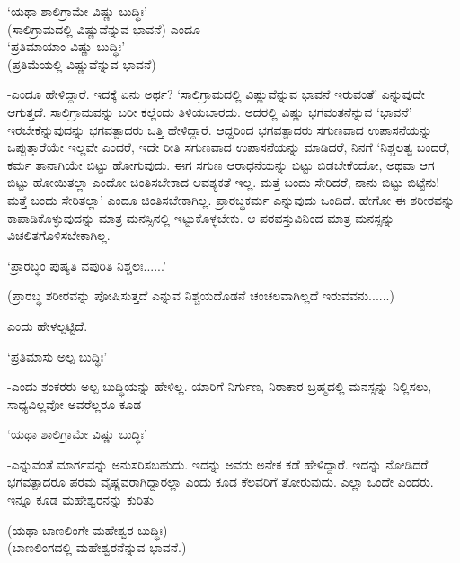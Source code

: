 \begin{shloka}
`ಯಥಾ ಶಾಲಿಗ್ರಾಮೇ ವಿಷ್ಣು ಬುದ್ಧಿಃ'\\
(ಸಾಲಿಗ್ರಾಮದಲ್ಲಿ ವಿಷ್ಣುವೆನ್ನುವ ಭಾವನೆ)-ಎಂದೂ\\
`ಪ್ರತಿಮಾಯಾಂ ವಿಷ್ಣು ಬುದ್ಧಿಃ'\\
(ಪ್ರತಿಮೆಯಲ್ಲಿ ವಿಷ್ಣುವೆನ್ನುವ ಭಾವನೆ)
\end{shloka}

-ಎಂದೂ ಹೇಳಿದ್ದಾರೆ. ಇದಕ್ಕೆ ಏನು ಅರ್ಥ? `ಸಾಲಿಗ್ರಾಮದಲ್ಲಿ ವಿಷ್ಣುವೆನ್ನುವ ಭಾವನೆ ಇರುವಂತೆ' ಎನ್ನುವುದೇ ಆಗುತ್ತದೆ. ಸಾಲಿಗ್ರಾಮವನ್ನು ಬರೀ ಕಲ್ಲೆಂದು ತಿಳಿಯಬಾರದು. ಅದರಲ್ಲಿ ವಿಷ್ಣು ಭಗವಂತನೆನ್ನುವ `ಭಾವನೆ' ಇರಬೇಕೆನ್ನುವುದನ್ನು ಭಗವತ್ಪಾದರು ಒತ್ತಿ ಹೇಳಿದ್ದಾರೆ. ಆದ್ದರಿಂದ ಭಗವತ್ಪಾದರು ಸಗುಣವಾದ ಉಪಾಸನೆಯನ್ನು ಒಪ್ಪುತ್ತಾರೆಯೇ ಇಲ್ಲವೇ ಎಂದರೆ, ಇದೇ ರೀತಿ ಸಗುಣವಾದ ಉಪಾಸನೆಯನ್ನು ಮಾಡಿದರೆ, ನಿನಗೆ `ನಿಶ್ಚಲತ್ವ ಬಂದರೆ, ಕರ್ಮ ತಾನಾಗಿಯೇ ಬಿಟ್ಟು ಹೋಗುವುದು. ಈಗ ಸಗುಣ ಆರಾಧನೆಯನ್ನು ಬಿಟ್ಟು ಬಿಡಬೇಕೆಂದೋ, ಅಥವಾ ಆಗ ಬಿಟ್ಟು ಹೋಯಿತಲ್ಲಾ ಎಂದೋ ಚಿಂತಿಸಬೇಕಾದ ಆವಶ್ಯಕತೆ ಇಲ್ಲ. ಮತ್ತೆ ಬಂದು ಸೇರಿದರೆ, ನಾನು ಬಿಟ್ಟು ಬಿಟ್ಟೆನು! ಮತ್ತೆ ಬಂದು ಸೇರಿತಲ್ಲಾ' ಎಂದೂ ಚಿಂತಿಸಬೇಕಾಗಿಲ್ಲ. ಪ್ರಾರಬ್ಧಕರ್ಮ ಎನ್ನುವುದು ಒಂದಿದೆ. ಹೇಗೋ ಈ ಶರೀರವನ್ನು ಕಾಪಾಡಿಕೊಳ್ಳುವುದನ್ನು ಮಾತ್ರ ಮನಸ್ಸಿನಲ್ಲಿ ಇಟ್ಟುಕೊಳ್ಳಬೇಕು. ಆ ಪರವಸ್ತುವಿನಿಂದ ಮಾತ್ರ ಮನಸ್ಸನ್ನು ವಿಚಲಿತಗೊಳಿಸಬೇಕಾಗಿಲ್ಲ.

\begin{shloka}
`ಪ್ರಾರಬ್ಧಂ ಪುಷ್ಯತಿ ವಪುರಿತಿ ನಿಶ್ಚಲಃ......'
\end{shloka}

(ಪ್ರಾರಬ್ಧ ಶರೀರವನ್ನು ಪೋಷಿಸುತ್ತದೆ ಎನ್ನುವ ನಿಶ್ಚಯದೊಡನೆ ಚಂಚಲವಾಗಿಲ್ಲದೆ ಇರುವವನು......)

ಎಂದು ಹೇಳಲ್ಪಟ್ಟಿದೆ.

\begin{shloka}
`ಪ್ರತಿಮಾಸು ಅಲ್ಪ ಬುದ್ಧಿಃ'
\end{shloka}

-ಎಂದು ಶಂಕರರು ಅಲ್ಪ ಬುದ್ಧಿಯನ್ನು ಹೇಳಿಲ್ಲ. ಯಾರಿಗೆ ನಿರ್ಗುಣ, ನಿರಾಕಾರ ಬ್ರಹ್ಮದಲ್ಲಿ ಮನಸ್ಸನ್ನು ನಿಲ್ಲಿಸಲು, ಸಾಧ್ಯವಿಲ್ಲವೋ ಅವರೆಲ್ಲರೂ ಕೂಡ

\begin{shloka}
`ಯಥಾ ಶಾಲಿಗ್ರಾಮೇ ವಿಷ್ಣು ಬುದ್ಧಿಃ'
\end{shloka}

-ಎನ್ನುವಂತೆ ಮಾರ್ಗವನ್ನು ಅನುಸರಿಸಬಹುದು. ಇದನ್ನು ಅವರು ಅನೇಕ ಕಡೆ ಹೇಳಿದ್ದಾರೆ. ಇದನ್ನು ನೋಡಿದರೆ ಭಗವತ್ಪಾದರೂ ಪರಮ ವೈಷ್ಣವರಾಗಿದ್ದಾರಲ್ಲಾ ಎಂದು ಕೂಡ ಕೆಲವರಿಗೆ ತೋರುವುದು. ಎಲ್ಲಾ ಒಂದೇ ಎಂದರು. ಇನ್ನೂ ಕೂಡ ಮಹೇಶ್ವರನನ್ನು ಕುರಿತು


\begin{shloka}
(ಯಥಾ ಬಾಣಲಿಂಗೇ ಮಹೇಶ್ವರ ಬುದ್ಧಿಃ)\\
(ಬಾಣಲಿಂಗದಲ್ಲಿ ಮಹೇಶ್ವರನೆನ್ನುವ ಭಾವನೆ.)
\end{shloka}

